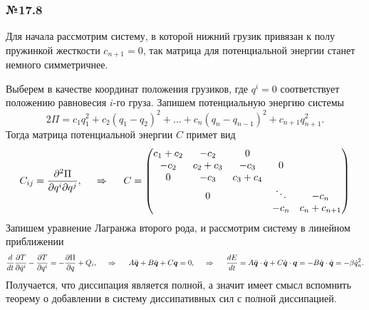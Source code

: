 \subsubsection*{№17.8}


Для начала рассмотрим систему, в которой нижний грузик привязан к полу пружинкой жесткости $c_{n+1} = 0$, так матрица для потенциальной энергии станет немного симметричнее. 

Выберем в качестве координат положения грузиков, где $q^i = 0$ соответствует положению равновесия $i$-го груза.  
Запишем потенциальную энергию системы
\begin{equation*}
    2 \Pi = c_1 q_1^2 + c_2(q_1-q_2)^2 + \ldots + c_n (q_n-q_{n-1})^2 + c_{n+1} q_{n+1}^2.
\end{equation*}
Тогда матрица потенциальной энергии $C$ примет вид
\begin{equation*}
    C_{ij} = \frac{\partial^2 \Pi}{\partial q^i \partial q^j},
    \hspace{0.5cm} \Rightarrow \hspace{0.5cm}
    C = \begin{pmatrix}
        c_1 + c_2 & -c_2 & 0 &  &  \\
        -c_2 & c_2 + c_3 & -c_3 & 0 &  \\
        0 & -c_3 & c_3 + c_4 &  &   \\
         & 0 &  & \ddots & -c_n \\
         &  &  & -c_n & c_n + c_{n+1}
    \end{pmatrix}
\end{equation*}
Запишем уравнение Лагранжа второго рода, и рассмотрим систему в линейном приближении
\begin{equation*}
    \frac{d }{d t} \frac{\partial T}{\partial \dot{q}^i} - \frac{\partial T}{\partial q^i}
     = - \frac{\partial \Pi}{\partial q} + Q_i,
     \hspace{0.5cm} \Rightarrow \hspace{0.5cm}
     A \ddot{\mbox{\boldmath $q$}} + B \dot{\mbox{\boldmath $q$}} + C \mbox{\boldmath $q$} = 0,
     \hspace{0.5cm} \Rightarrow \hspace{0.5cm}
     \frac{d E}{d t} =
     A \ddot{\mbox{\boldmath $q$}} \cdot \dot{\mbox{\boldmath $q$}} + C \dot{\mbox{\boldmath $q$}} \cdot \mbox{\boldmath $q$} = - B \dot{\mbox{\boldmath $q$}} \cdot \dot{\mbox{\boldmath $q$}} = - \beta \dot{q}_n^2.
\end{equation*}
Получается, что диссипация является полной, а значит имеет смысл вспомнить теорему о добавлении в систему диссипативных сил с полной диссипацией.

